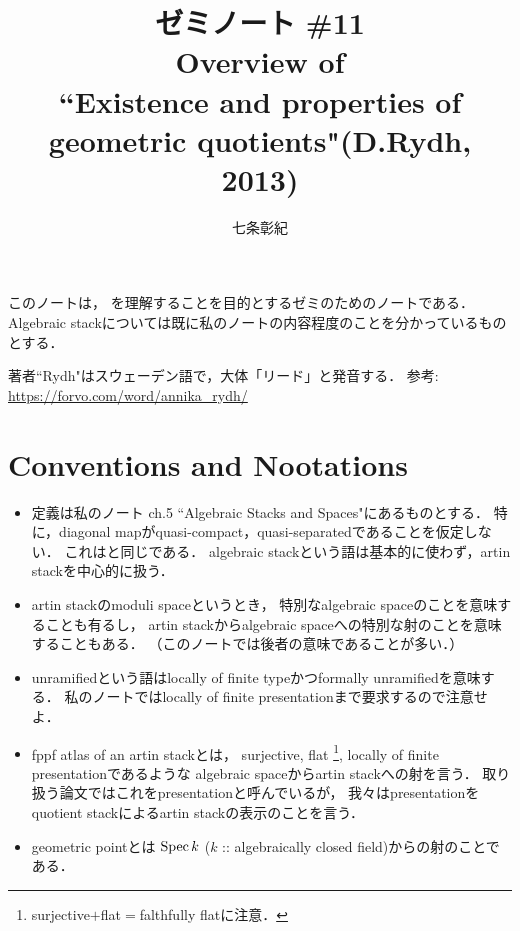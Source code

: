 


\title{ゼミノート \#11 \\ Overview of \\ ``Existence and properties of geometric quotients"(D.Rydh, 2013)}
\author{七条彰紀}
\maketitle
\tableofcontents
\vspace{10pt}

このノートは，
\cite{Rydh13}を理解することを目的とするゼミのためのノートである．
Algebraic stackについては既に私のノート\cite{SAAlgSt}の内容程度のことを分かっているものとする．

\begin{Remark}
    著者``Rydh"はスウェーデン語で，大体「リード」と発音する．
    参考: \url{https://forvo.com/word/annika_rydh/}
\end{Remark}

\section*{Conventions and Nootations}
    \begin{itemize}[leftmargin=*]
    \item 
        定義は私のノート\cite{SAAlgSt} ch.5 ``Algebraic Stacks and Spaces"にあるものとする．
        特に，diagonal mapがquasi-compact，quasi-separatedであることを仮定しない．
        これは\cite{Rydh13}と同じである．
        algebraic stackという語は基本的に使わず，artin stackを中心的に扱う．

    \item
        artin stackのmoduli spaceというとき，
        特別なalgebraic spaceのことを意味することも有るし，
        artin stackからalgebraic spaceへの特別な射のことを意味することもある．
        （このノートでは後者の意味であることが多い．）

    \item
        unramifiedという語はlocally of finite typeかつformally unramifiedを意味する．
        私のノートではlocally of finite presentationまで要求するので注意せよ．

    \item
        fppf atlas of an artin stackとは，
        surjective, flat
            \footnote{ surjective$+$flat$=$falthfully flatに注意． },
        locally of finite presentationであるような
        algebraic spaceからartin stackへの射を言う．
        取り扱う論文\cite{Rydh13}ではこれをpresentationと呼んでいるが，
        我々はpresentationをquotient stackによるartin stackの表示のことを言う．

    \item
        geometric pointとは
        $\operatorname{Spec} k$ ($k$ :: algebraically closed field)からの射のことである．
    \end{itemize}

